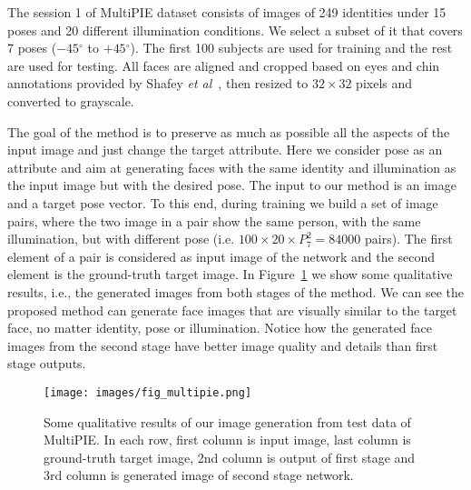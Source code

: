 \documentclass[10pt,twocolumn,letterpaper]{article}
\newcommand{\degree}{\ensuremath{{}^{\circ}}\xspace}
\def\etal{\emph{et al}\onedot}
\begin{document}
The session 1 of MultiPIE dataset consists of images of 249 identities under 15 poses and 20 different illumination conditions. We select a subset of it that covers 7 poses ($-45\degree$ to $+45\degree$). The first 100 subjects are used for training and the rest are used for testing.
All faces are aligned and cropped based on eyes and chin annotations provided by Shafey \etal~\cite{Shafey-pami13}, then resized to $32\times32$ pixels and converted to grayscale.

The goal of the method is to preserve as much as possible all the aspects of the input image and just change the target attribute. Here we consider pose as an attribute and aim at generating faces with the same identity and illumination as the input image but with the desired pose. The input to our method is an image and a target pose vector.
To this end, during training we build a set of image pairs, where the two image in a pair show the same person, with the same illumination, but with different pose (i.e. $100\times20\times P_{7}^{2}=84000$ pairs). The first element of a pair is considered as input image of the network and the second element is the ground-truth target image.
In Figure~\ref{fig:2stage_examples} we show some qualitative results, i.e., the generated images from both stages of the method. We can see the proposed method can generate face images that are visually similar to the target face, no matter identity, pose or illumination.
Notice how the generated face images from the second stage have better image quality and details than first stage outputs.

\begin{figure}[t]
\begin{center}
   \texttt{[image: images/fig\_multipie.png]}
\end{center}
\caption{Some qualitative results of our image generation from test data of MultiPIE. In each row, first column is input image, last column is ground-truth target image, 2nd column is output of first stage and 3rd column is generated image of second stage network.}
\label{fig:2stage_examples}
\end{figure}
\end{document}
